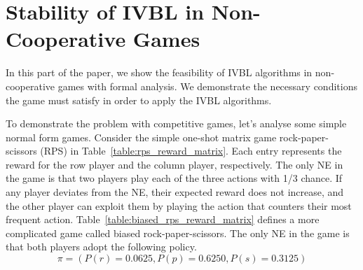 \documentclass[]{interact}
\theoremstyle{plain}%
\theoremstyle{definition}
\theoremstyle{remark}
\begin{document}
\section{Stability of IVBL in Non-Cooperative Games}
In this part of the paper, we show the feasibility of IVBL algorithms in non-cooperative games with formal analysis. We demonstrate the necessary conditions the game must satisfy in order to apply the IVBL algorithms.

\begin{table}
    \begin{minipage}{0.5\textwidth}
    \label{table:rps_reward_matrix}
    \end{minipage}
    \begin{minipage}{0.5\textwidth}
    \label{table:biased_rps_reward_matrix}
    \end{minipage}
\end{table}

To demonstrate the problem with competitive games, let's analyse some simple normal form games. Consider the simple one-shot matrix game rock-paper-scissors (RPS) in Table~\ref{table:rps_reward_matrix}. Each entry represents the reward for the row player and the column player, respectively. The only NE in the game is that two players play each of the three actions with 1/3 chance. If any player deviates from the NE, their expected reward does not increase, and the other player can exploit them by playing the action that counters their most frequent action. Table~\ref{table:biased_rps_reward_matrix} defines a more complicated game called biased rock-paper-scissors. The only NE in the game is that both players adopt the following policy.
\begin{equation}
    \pi=(P(r)=0.0625,P(p)=0.6250,P(s)=0.3125)
    \label{eq:biased_rps_policy}
\end{equation}
\end{document}
